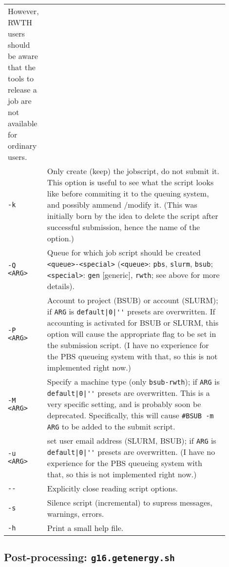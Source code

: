 \documentclass[   %
  final,          %
  a4paper         %
]{article}
\begin{document}
\begin{longtable}{p{0.1\linewidth}p{0.8\linewidth}}
    However, RWTH users should be aware that the tools to release a job are not available for ordinary users. \\
  {\lstinline`-k`}       & Only create (keep) the jobscript, do not submit it. 
    This option is useful to see what the script looks like before commiting it to the queuing system,
    and possibly ammend /modify it. 
    (This was initially born by the idea to delete the script after successful submission, hence the name of the option.)  \\
  {\lstinline`-Q <ARG>`} & Queue for which job script should be created {\lstinline`<queue>-<special>`} %
    ({\lstinline`<queue>`}: {\lstinline`pbs`}, {\lstinline`slurm`}, {\lstinline`bsub`}; %
     {\lstinline`<special>`}: {\lstinline`gen`} [generic], {\lstinline`rwth`}; see above for more details). \\
  {\lstinline`-P <ARG>`} & Account to project (BSUB) or account (SLURM); %
    if {\lstinline`ARG`} is {\lstinline`default|0|''`} presets are overwritten. 
    If accounting is activated for BSUB or SLURM, this option will cause the appropriate flag to be set in the submission script.
    (I have no experience for the PBS queueing system with that, so this is not implemented right now.)\\
  {\lstinline`-M <ARG>`} & Specify a machine type (only {\lstinline`bsub-rwth`}); %
    if {\lstinline`ARG`} is {\lstinline`default|0|''`} presets are overwritten. 
    This is a very specific setting, and is probably soon be deprecated.
    Specifically, this will cause \texttt{\#BSUB -m {\lstinline`ARG`}} to be added to the submit script. \\
  {\lstinline`-u <ARG>`} & set user email address (SLURM, BSUB); %
    if {\lstinline`ARG`} is {\lstinline`default|0|''`} presets are overwritten. 
    (I have no experience for the PBS queueing system with that, so this is not implemented right now.)\\
  {\lstinline`--`}       & Explicitly close reading script options. \\
  {\lstinline`-s`}       & Silence script (incremental) to supress messages, warnings, errors. \\
  {\lstinline`-h`}       & Print a small help file. \\
\end{longtable}

\subsection{Post-processing: \texorpdfstring{{\lstinline`g16.getenergy.sh`}}{g16.getenergy.sh}}
\label{sec:g16.getenergy}
\end{document}
